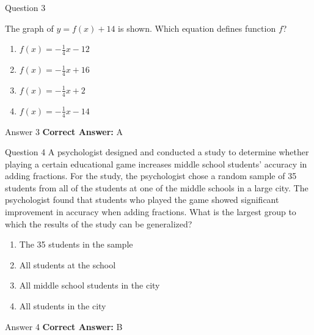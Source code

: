 \documentclass{beamer}
\begin{document}
\begin{frame}{Question 3}
\small
\begin{center}
\end{center}
The graph of \( y = f(x) + 14 \) is shown. Which equation defines function \( f \)?
\vspace{0.35cm}
\begin{enumerate}
    \item[A.] $f(x) = -\frac{1}{4}x - 12$
    \item[B.] $f(x) = -\frac{1}{4}x + 16$
    \item[C.] $f(x) = -\frac{1}{4}x + 2$
    \item[D.] $f(x) = -\frac{1}{4}x - 14$
\end{enumerate}
\end{frame}
\begin{frame}{Answer 3}
\small
\textbf{Correct Answer:} A
\end{frame}

\begin{frame}{Question 4}
\small
A psychologist designed and conducted a study to determine whether playing a certain educational game  
increases middle school students’ accuracy in adding fractions.  
For the study, the psychologist chose a random sample of 35 students from all of the students  
at one of the middle schools in a large city. The psychologist found that students who played the game  
showed significant improvement in accuracy when adding fractions.  
What is the largest group to which the results of the study can be generalized?
\vspace{0.35cm}
\begin{enumerate}
    \item[A.] The 35 students in the sample
    \item[B.] All students at the school
    \item[C.] All middle school students in the city
    \item[D.] All students in the city
\end{enumerate}
\end{frame}
\begin{frame}{Answer 4}
\small
\textbf{Correct Answer:} B
\end{frame}
\end{document}
